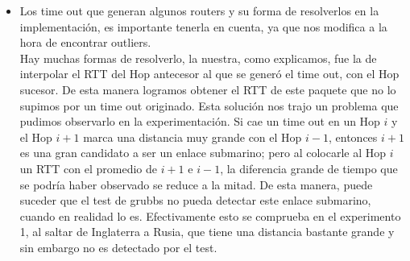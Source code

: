 \begin{itemize}
\item Los time out que generan algunos routers y su forma de resolverlos en la implementación, es importante tenerla en cuenta, ya que nos modifica a la hora de encontrar outliers.\\ 
Hay muchas formas de resolverlo, la nuestra, como explicamos, fue la de interpolar el RTT del Hop antecesor al que se generó el time out, con el Hop sucesor. De esta manera logramos obtener el RTT de este paquete que no lo supimos por un time out originado. Esta solución nos trajo un problema que pudimos observarlo en la experimentación. Si cae un time out en un Hop $i$ y el Hop $i+1$ marca una distancia muy grande con el Hop $i-1$, entonces $i+1$ es una gran candidato a ser un enlace submarino; pero al colocarle al Hop $i$ un RTT con el promedio de $i+1$ e $i-1$, la diferencia grande de tiempo que se podría haber observado se reduce a la mitad. De esta manera, puede suceder que el test de grubbs no pueda detectar este enlace submarino, cuando en realidad lo es. Efectivamente esto se comprueba en el experimento 1, al saltar de Inglaterra a Rusia, que tiene una distancia bastante grande y sin embargo no es detectado por el test.
\end{itemize}